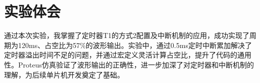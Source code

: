 \documentclass[12pt,hyperref,a4paper,UTF8]{ctexart}
\begin{document}
\section{实验体会}


通过本次实验，我掌握了定时器T1的方式2配置及中断机制的应用，成功实现了周期为120ms、占空比为57\%的波形输出。实验中，通过0.5ms定时中断累加解决了定时器溢出时间不足的问题，并通过宏定义灵活计算占空比，提升了代码的通用性。Proteus仿真验证了波形输出的正确性，进一步加深了对定时器和中断机制的理解，为后续单片机开发奠定了基础。
\end{document}
